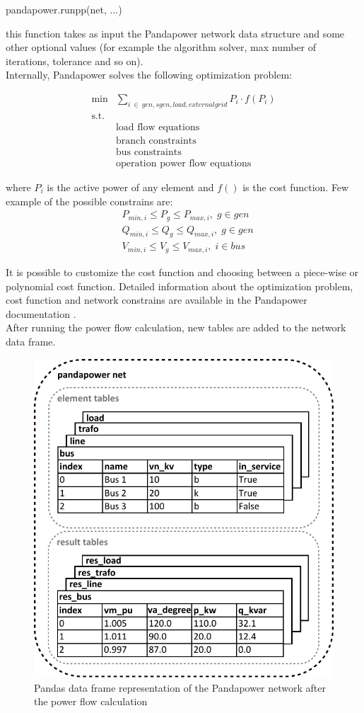 \begin{algorithm}[h]
\state pandapower.runpp(net, ...)
\end{algorithm}

\noindent this function takes as input the Pandapower network data structure and some other optional values (for example the algorithm solver, max number of iterations, tolerance and so on). \\

\noindent Internally, Pandapower solves the following optimization problem:

\begin{align*}
    \min &\sum_{i \: \in \: gen, sgen, load, external grid} P_i \cdot f(P_i) \\
        \textrm{s.t.} \\
        & \text{load flow equations} \\
        & \text{branch constraints} \\
        & \text{bus constraints} \\
        & \text{operation power flow equations}
\end{align*}

\noindent where $P_i$ is the active power of any element and $f()$ is the cost function. Few example of the possible constrains are: 
\begin{align*}
        & P_{min,i} \leq P_{g} \le P_{max,i}, \; g \in gen \\
        & Q_{min,i} \leq Q_{g} \le Q_{max,i}, \; g \in gen \\
        & V_{min,i} \leq V_{g} \le V_{max,i}, \; i \in bus
\end{align*}

\noindent It is possible to customize the cost function and choosing between a piece-wise or polynomial cost function. Detailed information about the optimization problem, cost function and network constrains are available in the Pandapower documentation \cite{pandapower2}. \\

After running the power flow calculation, new tables are added to the network data frame.
\begin{figure}[H]
\centering
    \includegraphics[width=.6\linewidth]{images/Background/Pandapower/Pandapower_resnet_big.pdf}
\caption{Pandas data frame representation of the Pandapower network after the power flow calculation}
\end{figure}

